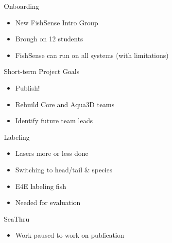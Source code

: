 \begin{frame}{Onboarding}
    \begin{itemize}
        \item New FishSense Intro Group
        \item Brough on 12 students
        \item FishSense can run on all systems (with limitations)
    \end{itemize}
\end{frame}

\begin{frame}{Short-term Project Goals}
    \begin{itemize}
        \item Publish!
        \item Rebuild Core and Aqua3D teams
        \item Identify future team leads
    \end{itemize}
\end{frame}

\begin{frame}{Labeling}
    \begin{itemize}
        \item Lasers more or less done
        \item Switching to head/tail \& species
        \item E4E labeling fish
        \item Needed for evaluation
    \end{itemize}
\end{frame}

\begin{frame}{SeaThru}
    \begin{itemize}
        \item Work paused to work on publication
    \end{itemize}
\end{frame}



